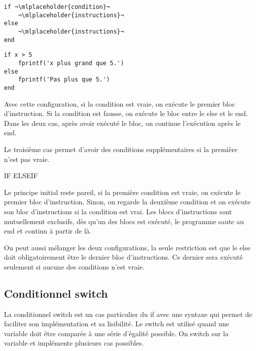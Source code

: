 \documentclass{tufte-handout}
\begin{document}
\begin{fullwidth}
    \begin{minipage}{.45\linewidth}
    \begin{lstlisting}[title={Structure du if simple}]
if ¬\mlplaceholder{condition}¬
    ¬\mlplaceholder{instructions}¬
else
    ¬\mlplaceholder{instructions}¬
end
    \end{lstlisting}
    \end{minipage}\hfill
    \begin{minipage}{.45\linewidth}
    \begin{lstlisting}[title={Exemple du if simple}]
if x > 5
    fprintf('x plus grand que 5.')
else
    fprintf('Pas plus que 5.')
end
    \end{lstlisting}
    \end{minipage}
\end{fullwidth}

Avec cette configuration, si la condition est vraie, on exécute le premier bloc d'instruction. Si la condition est fausse, on exécute le bloc entre le else et le end. Dans les deux cas, après avoir exécuté le bloc, on continue l'exécution après le end.

Le troisième cas permet d'avoir des conditions supplémentaires si la première n'est pas vraie.

IF ELSEIF

Le principe initial reste pareil, si la première condition est vraie, on exécute le premier bloc d'instruction. Sinon, on regarde la deuxième condition et on exécute son bloc d'instructions si la condition est vrai.
Les blocs d'instructions sont mutuellement exclusifs, dès qu'un des blocs est exécuté, le programme saute au end et continu à partir de là.

On peut aussi mélanger les deux configurations, la seule restriction est que le else doit obligatoirement être le dernier bloc d'instructions. Ce dernier sera exécuté seulement si aucune des conditions n'est vraie.

\subsection{Conditionnel switch}
La conditionnel switch est un cas particulier du if avec une syntaxe qui permet de faciliter son implémentation et sa lisibilité.
Le switch est utilisé quand une variable doit être comparée à une série d'égalité possible. On switch sur la variable et implémente plusieurs cas possibles.
\end{document}
